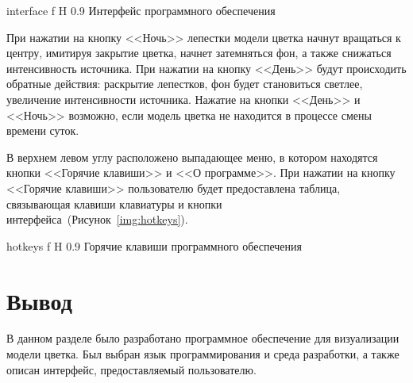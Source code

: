 {interface} 
{f}
{H}
{0.9\textwidth} 
{Интерфейс программного обеспечения} 

При нажатии на кнопку <<Ночь>> лепестки модели цветка начнут вращаться к центру, имитируя закрытие цветка, начнет затемняться фон, а также снижаться интенсивность источника. При нажатии на кнопку <<День>> будут происходить обратные действия: раскрытие лепестков, фон будет становиться светлее, увеличение интенсивности источника. Нажатие на кнопки <<День>> и <<Ночь>> возможно, если модель цветка не находится в процессе смены времени суток.

В верхнем левом углу расположено выпадающее меню, в котором находятся кнопки <<Горячие клавиши>> и <<О программе>>. При нажатии на кнопку <<Горячие клавиши>> пользователю будет предоставлена таблица, связывающая клавиши клавиатуры и кнопки интерфейса~(Рисунок~\ref{img:hotkeys}).

{hotkeys} 
{f}
{H}
{0.9\textwidth} 
{Горячие клавиши программного обеспечения}

\section*{Вывод}

В данном разделе было разработано программное обеспечение для визуализации модели цветка. Был выбран язык программирования и среда разработки, а также описан интерфейс, предоставляемый пользователю.
